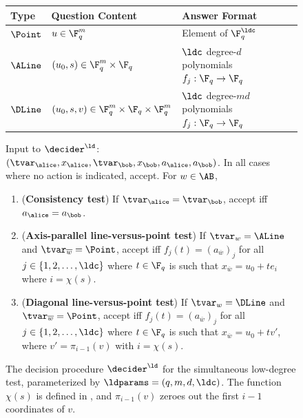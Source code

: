 \begin{figure}[!htbp]
  \centering
  \begin{gamespec}
    \setlength{\tabcolsep}{1em}
    \begin{tabularx}{\textwidth}{ l   l   X   }
      \toprule
      Type & Question Content & Answer Format \\
      \midrule
      $\Point$ & $ u \in \F_q^m$ & Element of $\F_q^\ldc$  \\
      $\ALine$ & $ (u_0, s) \in \F_q^m \times \F_q$ &
      $\ldc$ degree-$d$ polynomials $f_j: \F_q \to \F_q$\\
      $\DLine$ & $(u_0, s, v) \in \F_q^m \times \F_q \times \F_q^m$ & 
      $\ldc$ degree-$md$ polynomials $f_j: \F_q \to \F_q$\\
      \bottomrule
    \end{tabularx}

    \vspace{1em}

    Input to $\decider^\ld$: $(\tvar_\alice,x_\alice, \tvar_\bob, x_\bob,
    a_\alice, a_\bob)$.
    In all cases where no action is indicated, accept.
    For $w \in \AB$,

    \begin{enumerate}
      \setlength\itemsep{1pt}
    \item (\textbf{Consistency test}) If $\tvar_\alice = \tvar_\bob$, accept iff
      $a_\alice = a_\bob$.
    \item (\textbf{Axis-parallel line-versus-point test}) If $\tvar_w = \ALine$
      and $\tvar_{\overline{w}} = \Point$, accept iff $f_j(t) =
      (a_{\overline{w}})_j$ for all $j \in \{1,2,\ldots,\ldc\}$ where $t \in
      \F_q$ is such that $x_{\overline{w}} = u_0 + te_i$ where $i = \chi(s)$.
      
    \item (\textbf{Diagonal line-versus-point test}) If $\tvar_w = \DLine$ and
      $\tvar_{\overline{w}} = \Point$, accept iff $f_j(t) =
      (a_{\overline{w}})_j$ for all $j \in \{1,2,\ldots,\ldc\}$ where $t \in
      \F_q$ is such that $x_{\overline{w}} = u_0 + tv'$, where $v' =
      \pi_{i-1}(v)$ with $i = \chi(s)$.
    \end{enumerate}
  \end{gamespec}
  \caption{The decision procedure $\decider^\ld$ for the simultaneous low-degree
    test, parameterized by $\ldparams = (q,m,d,\ldc)$.
    The function $\chi(s)$ is defined in , and $\pi_{i-1}(v)$
    zeroes out the first $i-1$ coordinates of $v$.}
  \label{fig:ld-decider}
\end{figure}

